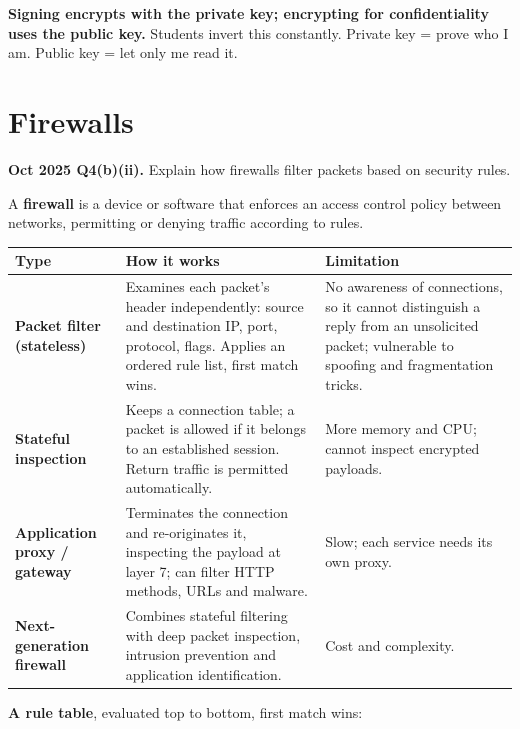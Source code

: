 \documentclass[11pt,a4paper]{article}
\begin{document}
\begin{dangerbox}
\textbf{Signing encrypts with the private key; encrypting for confidentiality uses the public key.} Students invert this constantly. Private key = prove who I am. Public key = let only me read it.
\end{dangerbox}

\section{Firewalls}

\begin{pyqbox}
\textbf{Oct 2025 Q4(b)(ii).} Explain how firewalls filter packets based on security rules.
\end{pyqbox}

\begin{solbox}
A \textbf{firewall} is a device or software that enforces an access control policy between networks, permitting or denying traffic according to rules.

\begin{center}\small
\begin{tabularx}{\textwidth}{>{\bfseries}p{} X X}
\toprule Type & How it works & Limitation\\
\midrule
Packet filter (stateless) & Examines each packet's header independently: source and destination IP, port, protocol, flags. Applies an ordered rule list, first match wins. & No awareness of connections, so it cannot distinguish a reply from an unsolicited packet; vulnerable to spoofing and fragmentation tricks.\\
Stateful inspection & Keeps a connection table; a packet is allowed if it belongs to an established session. Return traffic is permitted automatically. & More memory and CPU; cannot inspect encrypted payloads.\\
Application proxy / gateway & Terminates the connection and re-originates it, inspecting the payload at layer 7; can filter HTTP methods, URLs and malware. & Slow; each service needs its own proxy.\\
Next-generation firewall & Combines stateful filtering with deep packet inspection, intrusion prevention and application identification. & Cost and complexity.\\
\bottomrule
\end{tabularx}
\end{center}

\textbf{A rule table}, evaluated top to bottom, first match wins:


\end{solbox}
\end{document}
